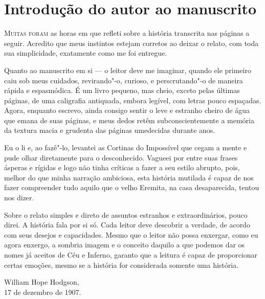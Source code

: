 
\chapter{Introdução do autor ao manuscrito}

\textsc{Muitas foram} as horas em que refleti sobre a história transcrita nas páginas a seguir. Acredito que meus instintos estejam
corretos ao deixar o relato, com toda sua simplicidade, exatamente como me foi entregue.
                                                       
Quanto ao manuscrito em si --- o leitor deve me imaginar, quando ele primeiro caiu sob meus cuidados, revirando"-o,
curioso, e perscrutando"-o de maneira rápida e espasmódica. É um livro pequeno, mas cheio, exceto pelas últimas páginas,
de uma caligrafia antiquada, embora legível, com letras pouco espaçadas. Agora, enquanto escrevo, ainda consigo sentir
o leve e estranho cheiro de água que emana de suas páginas, e meus dedos retêm subconscientemente a memória da textura
macia e grudenta das páginas umedecidas durante anos.

Eu o li e, ao fazê"-lo, levantei as Cortinas do Impossível que cegam a mente e pude olhar diretamente para o
desconhecido. Vagueei por entre suas frases ásperas e rígidas e logo não tinha críticas a fazer a seu estilo abrupto,
pois, melhor do que minha narração ambiciosa, esta história mutilada é capaz de nos fazer compreender tudo
aquilo que o velho Eremita, na casa desaparecida, tentou nos dizer.

Sobre o relato simples e direto de assuntos estranhos e extraordinários, pouco direi. A história fala por si só. Cada
leitor deve descobrir a verdade, de acordo com seus desejos e capacidades. Mesmo que o leitor não
possa enxergar, como eu agora enxergo, a sombria imagem e o conceito daquilo a que podemos dar os nomes já aceitos de
Céu e Inferno, garanto que a leitura é capaz de proporcionar certas emoções, mesmo se a história for considerada
somente uma história.
\bigskip

{\raggedleft
William Hope Hodgson,\\
17 de dezembro de 1907.
\par}


\clearpage

